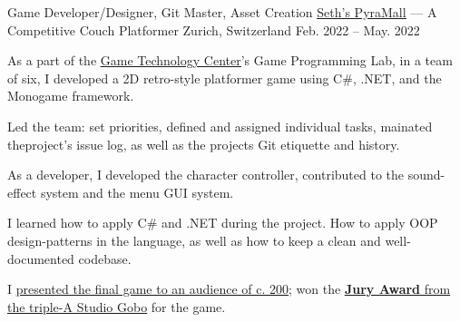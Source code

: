 

\begin{cventries}

    \cventry
    {Game Developer/Designer, Git Master, Asset Creation}
    {\href{https://www.youtube.com/watch?v=u3z3P-rHndg}{\uline{Seth's PyraMall}} --- A Competitive Couch Platformer}
    {Zurich, Switzerland}
    {Feb. 2022 -- May. 2022}
    {
        \begin{cvitems}
        \item As a part of the \href{https://gtc.inf.ethz.ch/education/game-programming-laboratory.html}{\uline{Game Technology Center}}'s Game Programming Lab, in a team of six, I developed a 2D retro-style platformer game using C\#, .NET, and the Monogame framework.
        \item Led the team: set priorities, defined  and assigned individual tasks,  mainated theproject's issue log, as well as the projects Git etiquette and history.
        \item As a developer, I developed the character controller, contributed to the sound-effect system and the menu GUI system.
        \item I learned how to apply C\# and .NET during the project. How to apply OOP design-patterns in the language, as well as how to keep a clean and well-documented codebase.
        \item I \href{https://youtu.be/AuFtp9p35H4?t=1211}{presented the final game to an audience of c. 200}; won the \href{https://youtu.be/AuFtp9p35H4?t=5614}{\textbf{\uline{Jury Award}} from the triple-A Studio Gobo} for the game.
        \end{cvitems}
    }


\end{cventries}
